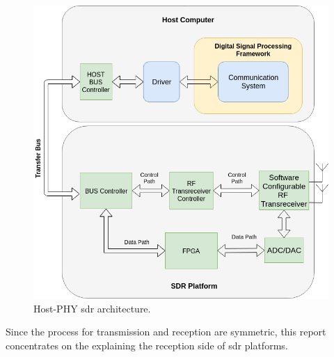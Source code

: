 \begin{figure}[h!]
\centering
\label{host_PHY}
\includegraphics[width=\textwidth]{Figure/Host_Phy.png}
\caption{Host-PHY \cite{nychis_enabling_nodate} \ac{sdr} architecture.}
\end{figure}


Since the process for transmission and reception are symmetric, this report concentrates on the explaining the reception side of 
\ac{sdr} platforms.

